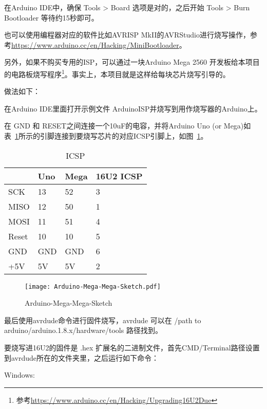 在Arduino IDE中，确保 Tools > Board 选项是对的，之后开始 Tools > Burn Bootloader 等待约15秒即可。

也可以使用编程器对应的软件比如AVRISP MkII的AVRStudio进行烧写操作，参考\url{https://www.arduino.cc/en/Hacking/MiniBootloader}。

另外，如果不购买专用的ISP，可以通过一块Arduino Mega 2560 开发板给本项目的电路板烧写程序\footnote{参考\url{https://www.arduino.cc/en/Hacking/Upgrading16U2Due}}。事实上，本项目就是这样给每块芯片烧写引导的。

做法如下：

在Arduino IDE里面打开示例文件 ArduinoISP并烧写到用作烧写器的Arduino上。

在 GND 和 RESET之间连接一个10uF的电容，并将Arduino Uno (or Mega)如表~\ref{tab:ICSP}所示的引脚连接到要烧写芯片的对应ICSP引脚上，如图~\ref{fig:Arduino-Mega-Mega-Sketch}。

\begin{table}[htbp]
    \centering
    \begin{tabular}{@{}llll@{}}
    \toprule
          & Uno & Mega & 16U2 ICSP \\ \midrule
    SCK   & 13  & 52   & 3         \\
    MISO  & 12  & 50   & 1         \\
    MOSI  & 11  & 51   & 4         \\
    Reset & 10  & 10   & 5         \\
    GND   & GND & GND  & 6         \\
    +5V   & 5V  & 5V   & 2         \\ \bottomrule
    \end{tabular}
    \caption{ICSP}
    \label{tab:ICSP}
\end{table}

\begin{figure}[htbp]
    \centering
    \texttt{[image: Arduino-Mega-Mega-Sketch.pdf]}
    \caption{Arduino-Mega-Mega-Sketch}
    \label{fig:Arduino-Mega-Mega-Sketch}
\end{figure}

最后使用avrdude命令进行固件烧写，avrdude 可以在 /path to arduino/arduino.1.8.x/hardware/tools 路径找到。

要烧写进16U2的固件是 .hex 扩展名的二进制文件，首先CMD/Terminal路径设置到avrdude所在的文件夹里，之后运行如下命令：

Windows:

